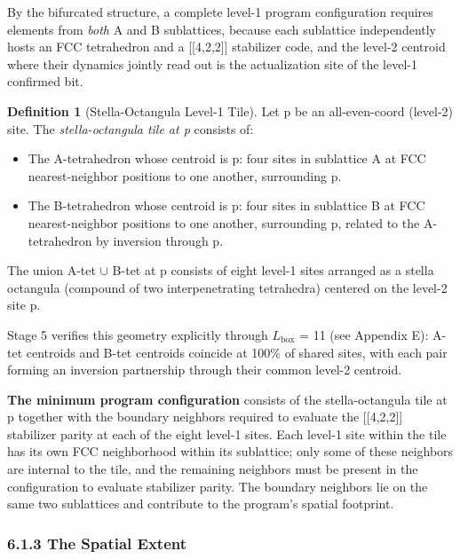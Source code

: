 \documentclass[11pt,oneside]{report}
\theoremstyle{definition}
\newtheorem{definition}[theorem]{Definition}
\theoremstyle{remark}
\begin{document}
By the bifurcated structure, a complete level-1 program configuration
requires elements from \emph{both} A and B sublattices, because each
sublattice independently hosts an FCC tetrahedron and a
[[4,2,2]] stabilizer code, and the level-2 centroid where their
dynamics jointly read out is the actualization site of the level-1
confirmed bit.

\begin{definition}[Stella-Octangula Level-1 Tile]
Let p be an
all-even-coord (level-2) site. The \emph{stella-octangula tile at p}
consists of:
\end{definition}

\begin{itemize}
\item
  The A-tetrahedron whose centroid is p: four sites in sublattice A at
  FCC nearest-neighbor positions to one another, surrounding p.
\end{itemize}

\begin{itemize}
\item
  The B-tetrahedron whose centroid is p: four sites in sublattice B at
  FCC nearest-neighbor positions to one another, surrounding p, related
  to the A-tetrahedron by inversion through p.
\end{itemize}

The union A-tet \ensuremath{\cup} B-tet at p consists of eight level-1 sites arranged as
a stella octangula (compound of two interpenetrating tetrahedra)
centered on the level-2 site p.

Stage 5 verifies this geometry explicitly through \ensuremath{L_{\mathrm{box}}} = 11 (see
Appendix E): A-tet centroids and B-tet centroids coincide at 100\% of
shared sites, with each pair forming an inversion partnership through
their common level-2 centroid.

\textbf{The minimum program configuration} consists of the
stella-octangula tile at p together with the boundary neighbors required
to evaluate the [[4,2,2]] stabilizer parity at each of the eight
level-1 sites. Each level-1 site within the tile has its own FCC
neighborhood within its sublattice; only some of these neighbors are
internal to the tile, and the remaining neighbors must be present in the
configuration to evaluate stabilizer parity. The boundary neighbors lie
on the same two sublattices and contribute to the program's spatial
footprint.

\subsubsection*{6.1.3 The Spatial Extent}
\end{document}
